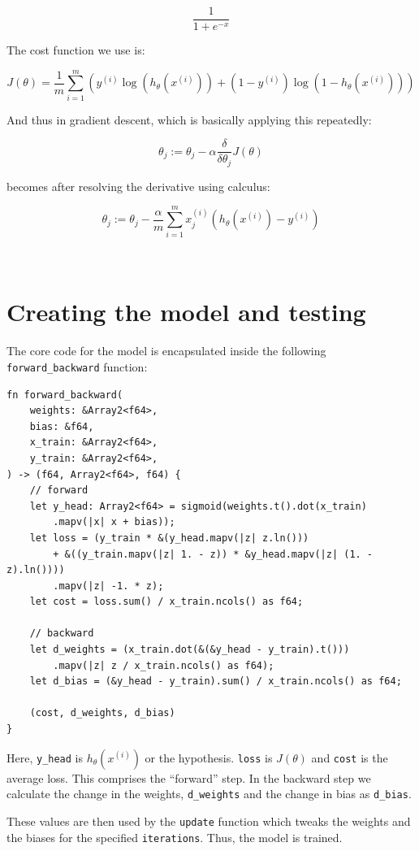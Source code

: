 \documentclass[12pt, a4]{article}
\begin{document}
\[ \frac{1}{1 + e^{-x}} \]

The cost function we use is:

\[ J(\theta) = \frac{1}{m} \sum_{i = 1}^{m}
  \left(
    y^{(i)}\log\left(h_{\theta}(x^{(i)})\right) +
    \left(1 - y^{(i)}\right)\log\left(1 - h_{\theta}(x^{(i)})\right)
  \right)
\]

And thus in gradient descent, which is basically applying this repeatedly:

\[
  \theta_{j} := \theta_{j} -
  \alpha \frac{\delta}{\delta\theta_{j}} J(\theta)
\]

becomes after resolving the derivative using calculus:

\[
  \theta_{j} := \theta_{j} -
  \frac{\alpha}{m} \sum_{i = 1}^{m} x_{j}^{(i)}
  \left(h_{\theta}(x^{(i)}) - y^{(i)} \right)
\]

\

\section{Creating the model and testing}

The core code for the model is encapsulated inside the following
\texttt{forward\_backward} function:

\begin{verbatim}
fn forward_backward(
    weights: &Array2<f64>,
    bias: &f64,
    x_train: &Array2<f64>,
    y_train: &Array2<f64>,
) -> (f64, Array2<f64>, f64) {
    // forward
    let y_head: Array2<f64> = sigmoid(weights.t().dot(x_train)
        .mapv(|x| x + bias));
    let loss = (y_train * &(y_head.mapv(|z| z.ln()))
        + &((y_train.mapv(|z| 1. - z)) * &y_head.mapv(|z| (1. - z).ln())))
        .mapv(|z| -1. * z);
    let cost = loss.sum() / x_train.ncols() as f64;

    // backward
    let d_weights = (x_train.dot(&(&y_head - y_train).t()))
        .mapv(|z| z / x_train.ncols() as f64);
    let d_bias = (&y_head - y_train).sum() / x_train.ncols() as f64;

    (cost, d_weights, d_bias)
}
\end{verbatim}

Here, \texttt{y\_head} is $h_{\theta}(x^{(i)})$ or the hypothesis. \texttt{loss}
is $J(\theta)$ and \texttt{cost} is the average loss. This comprises the
``forward'' step. In the backward step we calculate the change in the weights,
\texttt{d\_weights} and the change in bias as \texttt{d\_bias}.

These values are then used by the \texttt{update} function which tweaks the
weights and the biases for the specified \texttt{iterations}. Thus, the model
is trained.
\end{document}
